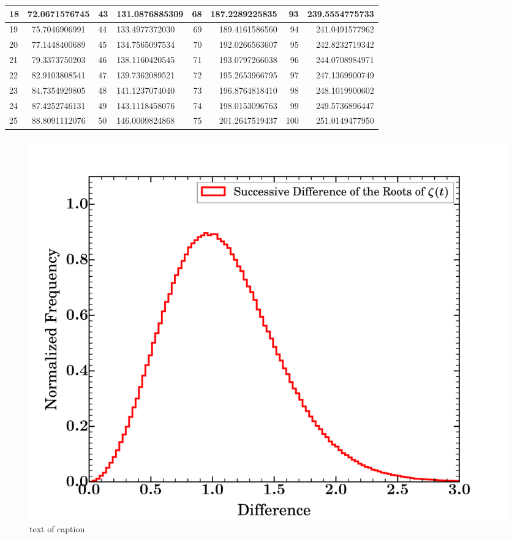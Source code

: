 \documentclass{amsproc}
\theoremstyle{definition}
\theoremstyle{remark}
\numberwithin{equation}{section}
\begin{document}
\begin{center}
\begin{tabular}{ | l | c || l | l || r | r || r | r | }
    18 & 72.0671576745  & 43 & 131.0876885309  & 68 & 187.2289225835  & 93 & 239.5554775733  \\ \hline 
    19 & 75.7046906991  & 44 & 133.4977372030  & 69 & 189.4161586560  & 94 & 241.0491577962  \\ \hline 
    20 & 77.1448400689  & 45 & 134.7565097534  & 70 & 192.0266563607  & 95 & 242.8232719342  \\ \hline 
    21 & 79.3373750203  & 46 & 138.1160420545  & 71 & 193.0797266038  & 96 & 244.0708984971  \\ \hline 
    22 & 82.9103808541  & 47 & 139.7362089521  & 72 & 195.2653966795  & 97 & 247.1369900749  \\ \hline 
    23 & 84.7354929805  & 48 & 141.1237074040  & 73 & 196.8764818410  & 98 & 248.1019900602  \\ \hline 
    24 & 87.4252746131  & 49 & 143.1118458076  & 74 & 198.0153096763  & 99 & 249.5736896447  \\ \hline 
    25 & 88.8091112076  & 50 & 146.0009824868  & 75 & 201.2647519437  & 100 & 251.0149477950  \\
    \hline
  \end{tabular}
\label{tab:first_100_roots}
\end{center}

\begin{figure}
\includegraphics[width=\columnwidth]{figures/zeta_zeros_normalized_differences.pdf}
\caption{text of caption}
\label{}
\end{figure}
\end{document}
